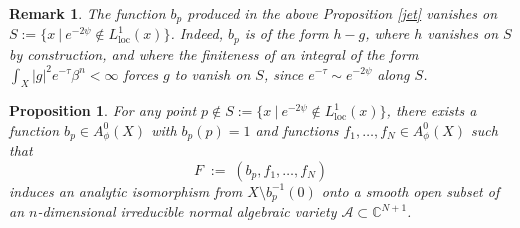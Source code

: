 \documentclass[a4paper, 12pt]{article}
\newcommand{\cA}{\mathcal{A}}
\newcommand{\loc}{\mathrm{loc}}
\newtheorem{prop}[thm]{Proposition}
\newtheorem{rem}[thm]{Remark}
\begin{document}
\begin{rem}\label{vanish}
The function $b_p$ produced in the above Proposition \ref{jet} vanishes on $S:=\{x~|~e^{-2\psi}\notin L^1_\loc(x)\}$.
Indeed, $b_p$ is of the form $h-g$, where $h$ vanishes on $S$ by construction, and where the finiteness
of an integral of the form $\int_X |g|^2 e^{-\tau}\beta^n<\infty$ forces $g$ to vanish on $S$, since
$e^{-\tau}\sim e^{-2\psi}$ along $S$.
\end{rem}

\begin{prop}\label{isom}
For any point $p\notin S:=\{x~|~e^{-2\psi}\notin L^1_\loc(x)\}$, there exists a function $b_p\in A_\phi^0(X)$ with $b_p(p)=1$
and functions $f_1,\dots,f_N\in A_\phi^0(X)$ such that
\[
F\;:=\;(b_p,f_1,\dots,f_N)
\]
induces an analytic isomorphism from $X\setminus b_p^{-1}(0)$ onto a smooth open subset of an $n$-dimensional irreducible
normal algebraic variety $\cA\subset\mathbb{C}^{N+1}$.
\end{prop}
\end{document}
